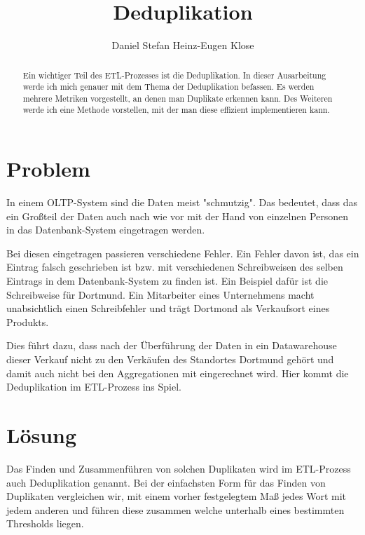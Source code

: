 \documentclass[sigconf]{acmart}
\begin{document}
\title{Deduplikation}

\author{Daniel Stefan Heinz-Eugen Klose}


\begin{abstract}
  Ein wichtiger Teil des ETL-Prozesses ist die Deduplikation.
  In dieser Ausarbeitung werde ich mich genauer mit dem Thema
  der Deduplikation
  befassen. Es werden mehrere Metriken vorgestellt, an denen
  man Duplikate erkennen kann.
  Des Weiteren werde ich eine Methode vorstellen, mit der man
  diese effizient implementieren kann.

\end{abstract}

\maketitle

\section*{Problem}
In einem OLTP-System sind die Daten meist "schmutzig". Das bedeutet, 
dass das ein Großteil der Daten auch nach wie vor mit der Hand von
einzelnen Personen in das Datenbank-System eingetragen werden. 

Bei diesen eingetragen
passieren verschiedene Fehler. Ein Fehler davon ist, das ein Eintrag 
falsch geschrieben ist bzw. mit verschiedenen Schreibweisen des
selben Eintrags in dem 
Datenbank-System zu finden ist. Ein Beispiel dafür ist die 
Schreibweise für Dortmund. Ein Mitarbeiter eines Unternehmens 
macht unabsichtlich einen Schreibfehler und trägt Dortmond als 
Verkaufsort eines Produkts.

Dies führt dazu, dass nach der Überführung der Daten in ein
Datawarehouse dieser Verkauf nicht zu den Verkäufen des Standortes 
Dortmund gehört und damit auch nicht bei den Aggregationen mit 
eingerechnet wird. Hier kommt die Deduplikation im ETL-Prozess 
ins Spiel.

\section*{Lösung}
Das Finden und Zusammenführen von solchen Duplikaten wird im 
ETL-Prozess auch Deduplikation genannt. Bei der einfachsten Form 
für das Finden von Duplikaten vergleichen wir, mit einem vorher 
festgelegtem Maß jedes Wort mit jedem anderen und führen diese 
zusammen welche unterhalb eines bestimmten Thresholds liegen.
\end{document}
